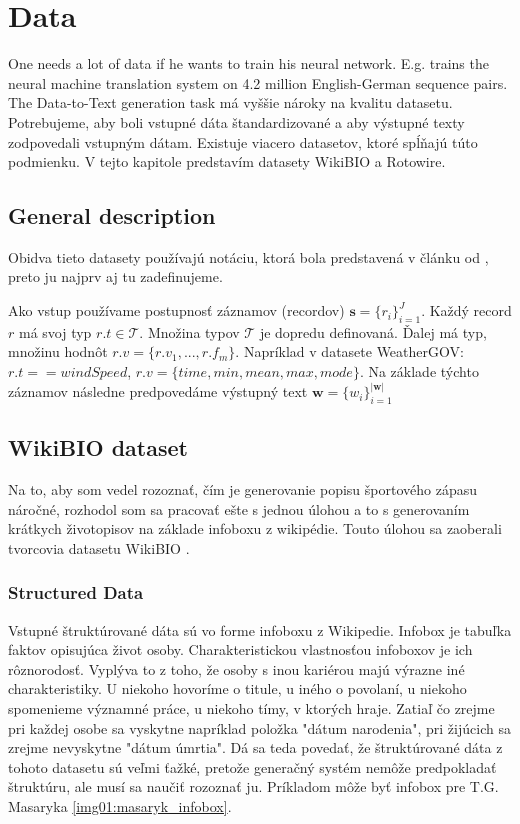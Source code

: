 \chapter{Data}

One needs a lot of data if he wants to train his neural network. E.g. \citep{sennrich2016} trains the neural machine translation system on 4.2 million English-German sequence pairs. The Data-to-Text generation task má vyššie nároky na kvalitu datasetu. Potrebujeme, aby boli vstupné dáta štandardizované a aby výstupné texty zodpovedali vstupným dátam. Existuje viacero datasetov, ktoré spĺňajú túto podmienku. V tejto kapitole predstavím datasety WikiBIO a Rotowire.

\section{General description}


Obidva tieto datasety používajú notáciu, ktorá bola predstavená v článku od \citep{liang-etal-2009-learning}, preto ju najprv aj tu zadefinujeme.

Ako vstup používame postupnosť záznamov (recordov) $ \mathbf{s} = \{ r_i \}_{i=1}^{J} $. Každý record $ r $ má svoj typ $ r.t \in \mathcal{T} $. Množina typov $\mathcal{T}$ je dopredu definovaná. Ďalej má typ, množinu hodnôt $ r.v = \{ r.v_1, ... , r.f_m\}$. Napríklad v datasete WeatherGOV: $ r.t == windSpeed $, $ r.v = \{time, min, mean, max, mode\}$. Na základe týchto záznamov následne predpovedáme výstupný text $ \mathbf{w} = \{ w_i\}_{i=1}^{ | \mathbf{w} | }$

\section{WikiBIO dataset}

Na to, aby som vedel rozoznať, čím je generovanie popisu športového zápasu náročné, rozhodol som sa pracovať ešte s jednou úlohou a to s generovaním krátkych životopisov na základe infoboxu z wikipédie. Touto úlohou sa zaoberali tvorcovia datasetu WikiBIO \citep{lebret2016neural}.

\subsection{Structured Data}

Vstupné štruktúrované dáta sú vo forme infoboxu z Wikipedie. Infobox je tabuľka faktov opisujúca život osoby. Charakteristickou vlastnosťou infoboxov je ich rôznorodosť. Vyplýva to z toho, že osoby s inou kariérou majú výrazne iné charakteristiky.  U niekoho hovoríme o titule, u iného o povolaní, u niekoho spomenieme významné práce, u niekoho tímy, v ktorých hraje. Zatiaľ čo zrejme pri každej osobe sa vyskytne napríklad položka "dátum narodenia", pri žijúcich sa zrejme nevyskytne "dátum úmrtia". Dá sa teda povedať, že štruktúrované dáta z tohoto datasetu sú veľmi ťažké, pretože generačný systém nemôže predpokladať štruktúru, ale musí sa naučiť rozoznať ju. Príkladom môže byť infobox pre T.G. Masaryka \ref{img01:masaryk_infobox}.

